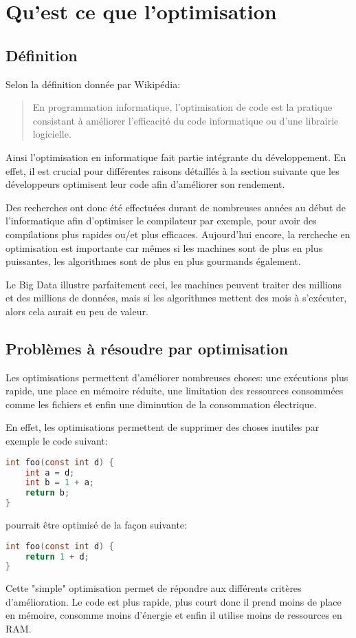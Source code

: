 \section{Qu'est ce que l'optimisation}
\subsection{Définition}
Selon la définition donnée par Wikipédia:
\begin{quote}
    En programmation informatique, l'optimisation de code est la pratique consistant à améliorer l'efficacité du code informatique ou d'une librairie logicielle. \cite{wiki:Optimisation_de_code}
\end{quote}
Ainsi l'optimisation en informatique fait partie intégrante du développement. En effet, il est crucial pour différentes raisons détaillés à la section suivante que les développeurs optimisent leur code afin d'améliorer son rendement.

Des recherches ont donc été effectuées durant de nombreuses années au début de l'informatique afin d'optimiser le compilateur par exemple, pour avoir des compilations plus rapides ou/et plus efficaces. Aujourd'hui encore, la rercheche en optimisation est importante car mêmes si les machines sont de plus en plus puissantes, les algorithmes sont de plus en plus gourmands également.

Le Big Data illustre parfaitement ceci, les machines peuvent traiter des millions et des millions de données, mais si les algorithmes mettent des mois à s'exécuter, alors cela aurait eu peu de valeur.

\subsection{Problèmes à résoudre par optimisation}
Les optimisations permettent d'améliorer nombreuses choses: une exécutions plus rapide, une place en mémoire réduite, une limitation des ressources consommées comme les fichiers et enfin une diminution de la consommation électrique.

En effet, les optimisations permettent de supprimer des choses inutiles par exemple le code suivant:
\newpage
\begin{center}
\begin{lstlisting}[language=c, xleftmargin=.35\textwidth, caption={Exemple de code non optimisé}, captionpos=b]
int foo(const int d) {
    int a = d;
    int b = 1 + a;
    return b;
}
\end{lstlisting}
\end{center}
pourrait être optimisé de la façon suivante:
\begin{lstlisting}[language=c, xleftmargin=.35\textwidth, caption={Exemple de code optimisé}, captionpos=b]
int foo(const int d) {
    return 1 + d;
}
\end{lstlisting}
Cette "simple" optimisation permet de répondre aux différents critères d'amélioration. Le code est plus rapide, plus court donc il prend moins de place en mémoire, consomme moins d'énergie et enfin il utilise moins de ressources en RAM.

